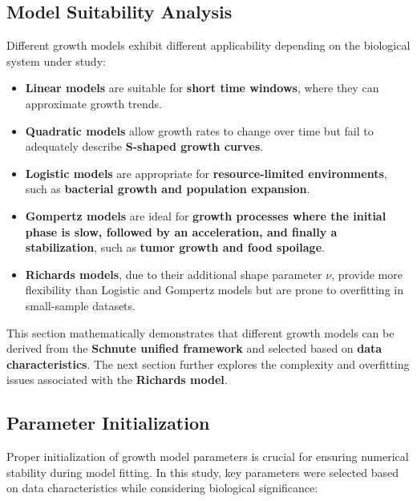 \documentclass{article}
\begin{document}
\subsection{Model Suitability Analysis}

Different growth models exhibit different applicability depending on the biological system under study:
\begin{itemize}
    \item \textbf{Linear models} are suitable for \textbf{short time windows}, where they can approximate growth trends.
    \item \textbf{Quadratic models} allow growth rates to change over time but fail to adequately describe \textbf{S-shaped growth curves}.
    \item \textbf{Logistic models} are appropriate for \textbf{resource-limited environments}, such as \textbf{bacterial growth and population expansion}.
    \item \textbf{Gompertz models} are ideal for \textbf{growth processes where the initial phase is slow, followed by an acceleration, and finally a stabilization}, such as \textbf{tumor growth and food spoilage}.
    \item \textbf{Richards models}, due to their additional shape parameter \( \nu \), provide more flexibility than Logistic and Gompertz models but are prone to overfitting in small-sample datasets.
\end{itemize}

This section mathematically demonstrates that different growth models can be derived from the \textbf{Schnute unified framework} and selected based on \textbf{data characteristics}. The next section further explores the complexity and overfitting issues associated with the \textbf{Richards model}.

\subsection{Parameter Initialization}

Proper initialization of growth model parameters is crucial for ensuring numerical stability during model fitting. In this study, key parameters were selected based on data characteristics while considering biological significance:
\end{document}
